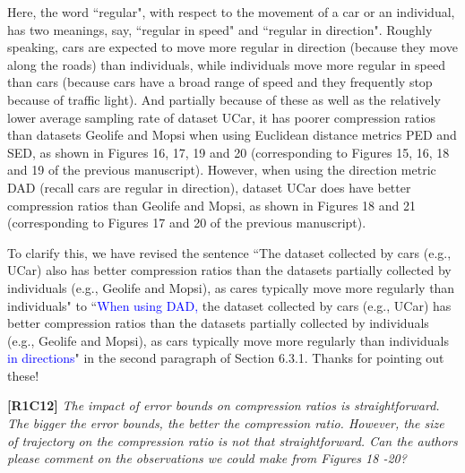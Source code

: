 \documentclass{letter}
\begin{document}
{Here, the word ``regular", with respect to the movement of a car or an individual, has two meanings, say, ``regular in speed" and ``regular in direction". Roughly speaking, cars are expected to move more regular in direction (because they move along the roads) than individuals, while individuals move more regular in speed than cars (because cars have a broad range of speed and they frequently stop because of traffic light).
And partially because of these as well as the relatively lower average sampling rate of dataset UCar, it has poorer compression ratios than datasets Geolife and Mopsi when using Euclidean distance metrics PED and SED, as shown in Figures 16, 17, 19 and 20 (corresponding to Figures 15, 16, 18 and 19 of the previous manuscript). However, when using the direction metric DAD (recall cars are regular in direction), dataset UCar does have better compression ratios than Geolife and Mopsi, as shown in Figures 18 and 21 (corresponding to Figures 17 and 20 of the previous manuscript).

To clarify this, we have revised the sentence ``The dataset collected by cars (e.g., UCar) also has better compression ratios than the datasets partially collected by individuals (e.g., Geolife and Mopsi), as cares typically move more regularly than individuals" to ``\textcolor{blue}{When using DAD,} the dataset collected by cars (e.g., UCar) has better compression ratios than the datasets partially collected by individuals (e.g., Geolife and Mopsi), as cars typically move more regularly than individuals \textcolor{blue}{in directions}" in the second paragraph of Section 6.3.1.
Thanks for pointing out these!


\textbf{[R1C12]} \emph{The impact of error bounds on compression ratios is straightforward. The bigger the error bounds, the better the compression ratio. However, the size of trajectory on the compression ratio is not that straightforward. Can the authors please comment on the observations we could make from Figures 18 -20? }

}
\end{document}
